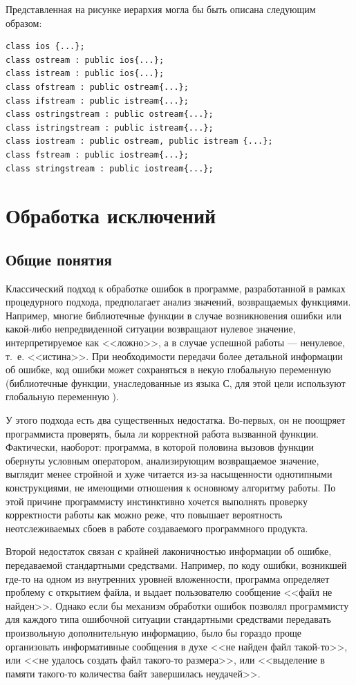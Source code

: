 Представленная на рисунке иерархия могла бы быть описана следующим образом: 
\begin{lstlisting}
class ios {...};
class ostream : public ios{...};
class istream : public ios{...};
class ofstream : public ostream{...};
class ifstream : public istream{...};
class ostringstream : public ostream{...};
class istringstream : public istream{...};
class iostream : public ostream, public istream {...};
class fstream : public iostream{...};
class stringstream : public iostream{...};
\end{lstlisting}

\section[Обработка исключений]{Обработка исключений}
\subsection[Общие понятия]{Общие понятия}
Классический подход к обработке ошибок в программе, разработанной в рамках процедурного подхода, предполагает анализ
значений, возвращаемых функциями. Например, многие библиотечные функции в случае возникновения ошибки или какой-либо
непредвиденной ситуации возвращают нулевое значение, интерпретируемое как <<ложно>>, а в случае успешной работы ---
ненулевое, т.~е. <<истина>>. При необходимости передачи более детальной информации об ошибке, код ошибки может
сохраняться в некую глобальную переменную (библиотечные функции, унаследованные из языка С,  для этой цели используют
глобальную переменную ).

У этого подхода есть два существенных недостатка. Во-первых, он не поощряет программиста проверять, была ли корректной
работа вызванной функции. Фактически, наоборот: программа, в которой половина вызовов функции обернуты условным
оператором, анализирующим возвращаемое значение, выглядит менее стройной и хуже читается из-за насыщенности однотипными
конструкциями, не имеющими отношения к основному алгоритму работы. По этой причине программисту инстинктивно хочется
выполнять проверку корректности работы как можно реже, что повышает вероятность неотслеживаемых сбоев в работе
создаваемого программного продукта. 

Второй недостаток связан с крайней лаконичностью информации об ошибке, передаваемой стандартными средствами. Например,
по коду ошибки, возникшей где-то на одном из внутренних уровней вложенности, программа определяет проблему с открытием
файла, и выдает пользователю сообщение <<файл не найден>>. Однако если бы механизм обработки ошибок позволял программисту
для каждого типа ошибочной ситуации стандартными средствами передавать произвольную дополнительную информацию, было бы
гораздо проще организовать информативные сообщения в духе <<не найден файл такой-то>>, или <<не удалось создать файл
такого-то размера>>, или <<выделение в памяти такого-то количества байт завершилась неудачей>>. 

